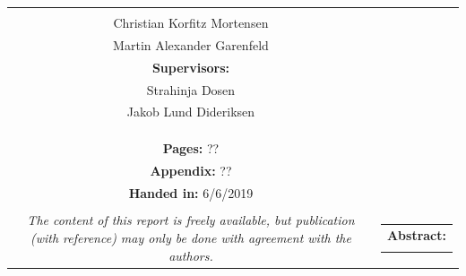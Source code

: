 \begin{titlepage}
\begin{nopagebreak}
{\begin{tabular}{cc}
{{						\textbf{Participants:}\\
						Christian Korfitz Mortensen\\
						Martin Alexander Garenfeld\\
						
						
						
						\textbf{Supervisors:}\\
						Strahinja Dosen\\
						Jakob Lund Dideriksen\\
						
						
					}\\
					\\
					\\
					\textbf{Pages:} ??\\
					\textbf{Appendix:} ?? \\
					\textbf{Handed in:} 6/6/2019\\
					\\
					\textit{The content of this report is freely available, but publication (with reference) may only be done with
						agreement with the authors.}
					\vfill } &
				\parbox{7cm}{
					\vspace{-.55cm}
					\hfill
					\begin{tabular}{l}
						{\textbf{Abstract:}} \\
						\fbox{
							\parbox{8.5cm}{\bigskip
								{\vfill{\small 
										\bigskip}}
						}}
				\end{tabular}}
		\end{tabular}} %
		
		
		
	\end{nopagebreak}
\end{titlepage}
%